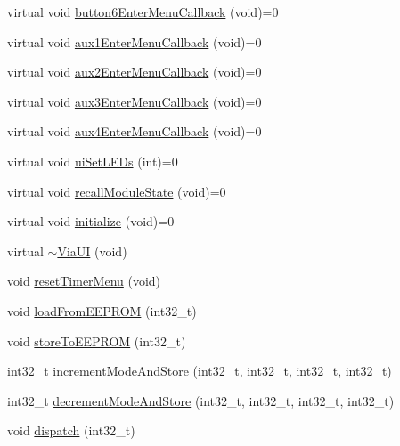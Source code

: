 \begin{DoxyCompactItemize}
\item 
virtual void \mbox{\hyperlink{class_via_u_i_ae59e7ff3a6ba1f641a4a916e47a26513}{button6\+Enter\+Menu\+Callback}} (void)=0
\item 
virtual void \mbox{\hyperlink{class_via_u_i_a578111861e912bf43d3f320a0faffb0f}{aux1\+Enter\+Menu\+Callback}} (void)=0
\item 
virtual void \mbox{\hyperlink{class_via_u_i_a1f51fc259471364f91bd0a1592824dab}{aux2\+Enter\+Menu\+Callback}} (void)=0
\item 
virtual void \mbox{\hyperlink{class_via_u_i_aa62c9f8dc58d37fc2a3abc7bce1cd16e}{aux3\+Enter\+Menu\+Callback}} (void)=0
\item 
virtual void \mbox{\hyperlink{class_via_u_i_a36cc4bac8f774c2a59ab8635be05f884}{aux4\+Enter\+Menu\+Callback}} (void)=0
\item 
virtual void \mbox{\hyperlink{class_via_u_i_a4bd3d575f4efe1273d6e4645454ead52}{ui\+Set\+L\+E\+Ds}} (int)=0
\item 
virtual void \mbox{\hyperlink{class_via_u_i_ac5b88708650fe41ea955c77de580f6f5}{recall\+Module\+State}} (void)=0
\item 
virtual void \mbox{\hyperlink{class_via_u_i_a573ba7aef8f4982ec4900258c770bdbb}{initialize}} (void)=0
\item 
virtual \mbox{\hyperlink{class_via_u_i_ad60e005bc6a105009be39325664e5a32}{$\sim$\+Via\+UI}} (void)
\item 
void \mbox{\hyperlink{class_via_u_i_ac7abd4e9e7fa598dedab8b4c2486d010}{reset\+Timer\+Menu}} (void)
\item 
void \mbox{\hyperlink{class_via_u_i_aecfaa511595dcab4d38caff73abdd54b}{load\+From\+E\+E\+P\+R\+OM}} (int32\+\_\+t)
\item 
void \mbox{\hyperlink{class_via_u_i_a09fbb5e879fb9e2e77c4642dae4ab83a}{store\+To\+E\+E\+P\+R\+OM}} (int32\+\_\+t)
\item 
int32\+\_\+t \mbox{\hyperlink{class_via_u_i_a301e1692cc55b1ee55ba0133b5308f87}{increment\+Mode\+And\+Store}} (int32\+\_\+t, int32\+\_\+t, int32\+\_\+t, int32\+\_\+t)
\item 
int32\+\_\+t \mbox{\hyperlink{class_via_u_i_a85d24875e904ac7cf63f0762e1ccb3c0}{decrement\+Mode\+And\+Store}} (int32\+\_\+t, int32\+\_\+t, int32\+\_\+t, int32\+\_\+t)
\item 
void \mbox{\hyperlink{class_via_u_i_ae8bb5e76df4a1b3c1127829bd1be21f7}{dispatch}} (int32\+\_\+t)
\end{DoxyCompactItemize}
